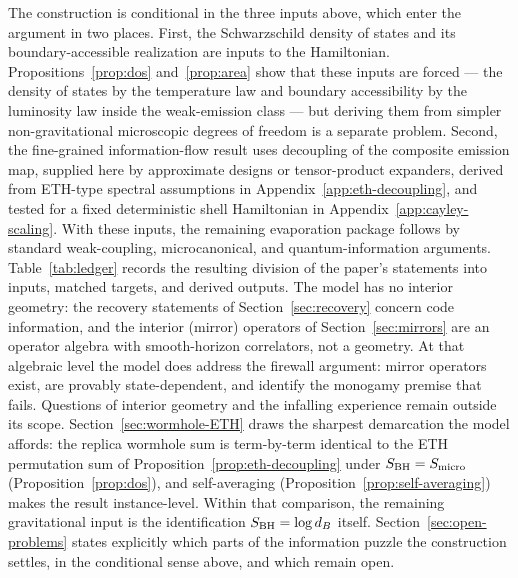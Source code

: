 \documentclass[12pt]{article}
\newcommand{\Smicro}{S_{\rm micro}}
\begin{document}
The construction is conditional in the three inputs above, which enter the
argument in two places.  First, the
Schwarzschild density of states and its boundary-accessible realization are
inputs to the Hamiltonian.  Propositions~\ref{prop:dos} and~\ref{prop:area}
show that these inputs are forced --- the density of states by the
temperature law and boundary accessibility by the luminosity law inside the
weak-emission class --- but
deriving them from simpler non-gravitational microscopic degrees of freedom
is a separate problem.  Second, the fine-grained information-flow result uses
decoupling of the composite emission map, supplied here by approximate
designs or tensor-product expanders, derived from ETH-type spectral
assumptions in Appendix~\ref{app:eth-decoupling}, and tested for a fixed
deterministic shell Hamiltonian in Appendix~\ref{app:cayley-scaling}.  With
these inputs, the remaining evaporation package follows by standard
weak-coupling, microcanonical, and quantum-information arguments.
Table~\ref{tab:ledger} records the resulting division of the paper's
statements into inputs, matched targets, and derived outputs.  The model
has no interior geometry: the recovery statements of
Section~\ref{sec:recovery} concern code information, and the interior
(mirror) operators of Section~\ref{sec:mirrors} are an operator algebra with
smooth-horizon correlators, not a geometry.  At that algebraic level the
model does address the firewall argument: mirror operators exist, are
provably state-dependent, and identify the monogamy premise that fails.
Questions of interior geometry and the infalling experience remain outside
its scope.
Section~\ref{sec:wormhole-ETH} draws the sharpest demarcation the model
affords: the replica wormhole sum \cite{PeningtonShenkerStanfordYang2022}
is term-by-term identical to the ETH permutation sum of
Proposition~\ref{prop:eth-decoupling} under $S_{\rm BH}=\Smicro$
(Proposition~\ref{prop:dos}), and self-averaging
(Proposition~\ref{prop:self-averaging}) makes the result instance-level.
Within that comparison, the remaining gravitational input is the
identification $S_{\rm BH}=\log d_B$ itself.
Section~\ref{sec:open-problems} states explicitly which parts of the
information puzzle the construction settles, in the conditional sense above,
and which remain open.
\end{document}

